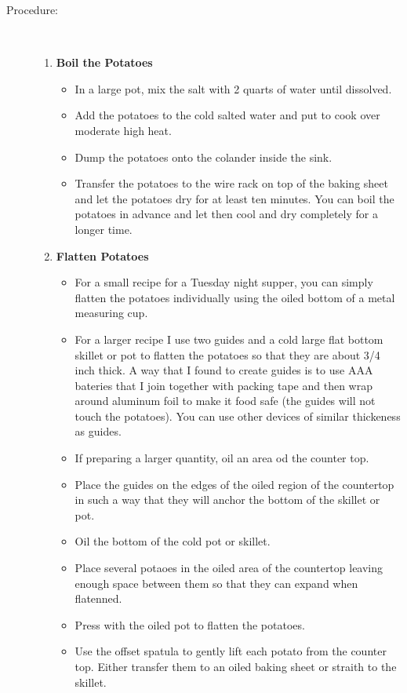 \documentclass[11pt,letterpaper]{article}
\begin{document}
\begin{description}
\item[Procedure:]\ \\
	\begin{enumerate}
	\item {\bf Boil the Potatoes}
	\begin{itemize}
	\item In a large pot, mix the salt with 2 quarts of water until dissolved.
	\item Add the potatoes to the cold salted water and put to cook over moderate high heat.
	\item Dump the potatoes onto the colander inside the sink.
	\item Transfer the potatoes to the wire rack on top of the baking sheet and let the potatoes dry for at least ten minutes. You can boil the potatoes in advance and let then cool and dry completely for a longer time.
	\end{itemize}
	\item {\bf Flatten Potatoes}
	\begin{itemize}
          \item For a small recipe for a Tuesday night supper, you can simply flatten the potatoes individually using the oiled bottom of a metal measuring cup.
	\item For a larger recipe I use two guides and a cold large flat bottom skillet or pot to flatten the potatoes so that they are about 3/4 inch thick. A way that I found to create guides is to use AAA bateries that I join together with packing tape and then wrap around aluminum foil to make it food safe (the guides will not touch the potatoes). You can use other devices of similar thickeness as guides. 
	\item If preparing a larger quantity, oil an area od the counter top.
        \item Place the guides on the edges of the oiled region of the countertop in such a way that they will anchor the bottom of the skillet or pot.
        \item Oil the bottom of the cold pot or skillet.
        \item Place several potaoes in the oiled area of the countertop leaving enough space between them so that they can expand when flatenned.
        \item Press with the oiled pot to flatten the potatoes.
        \item Use the offset spatula to gently lift each potato from the counter top. Either transfer them to an oiled baking sheet or straith to the skillet. 

\end{itemize}
\end{enumerate}
\end{description}
\end{document}
